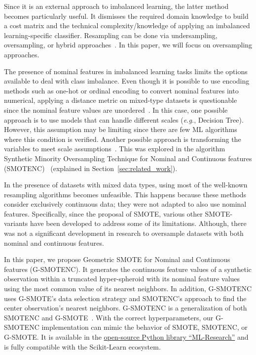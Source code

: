 \documentclass[preprint,12pt]{elsarticle}
\begin{document}
{Since it is an external approach to imbalanced learning, the latter method
becomes particularly useful. It dismisses the required domain knowledge to
build a cost matrix and the technical complexity/knowledge of applying an
imbalanced learning-specific classifier. Resampling can be done via
undersampling, oversampling, or hybrid approaches~\cite{tarekegn2021review}. In
this paper, we will focus on oversampling approaches.

The presence of nominal features in imbalanced learning tasks limits the
options available to deal with class imbalance. Even though it is possible to
use encoding methods such as one-hot or ordinal encoding to convert nominal
features into numerical, applying a distance metric on mixed-type datasets is
questionable since the nominal feature values are
unordered~\cite{lumijarvi2004comparison}. In this case, one possible approach
is to use models that can handle different scales (\textit{e.g.}, Decision
Tree). However, this assumption may be limiting since there are few ML
algorithms where this condition is verified. Another possible approach is
transforming the variables to meet scale
assumptions~\cite{lumijarvi2004comparison}. This was explored in the algorithm
Synthetic Minority Oversampling Technique for Nominal and Continuous features
(SMOTENC)~\cite{Chawla2002} (explained in Section~\ref{sec:related_work}).

In the presence of datasets with mixed data types, using most of the
well-known resampling algorithms becomes unfeasible. This happens because
these methods consider exclusively continuous data; they were not adapted to
also use nominal features. Specifically, since the proposal of SMOTE, various
other SMOTE-variants have been developed to address some of its limitations.
Although, there was not a significant development in research to oversample
datasets with both nominal and continuous features. 

In this paper, we propose Geometric SMOTE for Nominal and Continuous features
(G-SMOTENC). It generates the continuous feature values of a synthetic
observation within a truncated hyper-spheroid with its nominal feature values using
the most common value of its nearest neighbors. In addition, G-SMOTENC uses
G-SMOTE's data selection strategy and SMOTENC's approach to find the
center observation's nearest neighbors. G-SMOTENC is a generalization of both
SMOTENC and G-SMOTE~\cite{douzas2019geometric}. With the correct
hyperparameters, our G-SMOTENC implementation can mimic the behavior of SMOTE,
SMOTENC, or G-SMOTE\@. It is available in the
\href{https://github.com/joaopfonseca/ml-research}{open-source Python library
``ML-Research''} and is fully compatible with the Scikit-Learn ecosystem.

}
\end{document}
